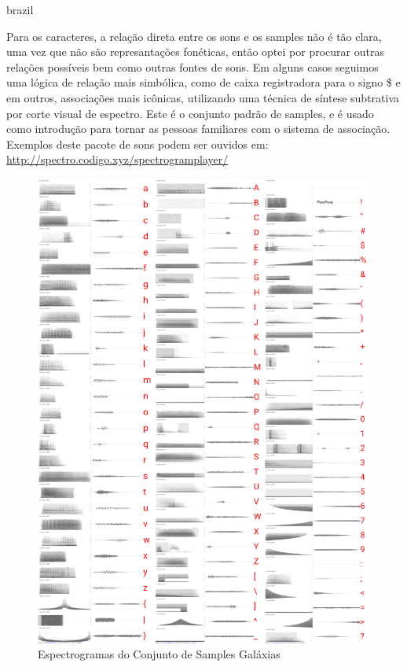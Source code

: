 \begin{otherlanguage*}{brazil}
\begin{description}
Para os caracteres, a relação direta entre os sons e os samples não é tão clara, uma vez que não são represantações fonéticas, então optei por procurar outras relações possíveis bem como outras fontes de sons. Em alguns casos seguimos uma lógica de relação mais simbólica, como de caixa registradora para o signo \$ e em outros, associações mais icônicas, utilizando uma técnica de síntese subtrativa por corte visual de espectro. Este é o conjunto padrão de samples, e é usado como introdução para tornar as pessoas familiares com o sistema de associação. Exemplos deste pacote de sons podem ser ouvidos em: \url{http://spectro.codigo.xyz/spectrogramplayer/}

\begin{figure}[htb]
    \caption{\label{samplesgalaxias}Espectrogramas do Conjunto de Samples Galáxias}
    \begin{center}
        \includegraphics[width=0.7\linewidth]{pictures/cap3/bandagalaxias.jpg}
    \end{center}
\end{figure}



\end{description}
\end{otherlanguage*}
